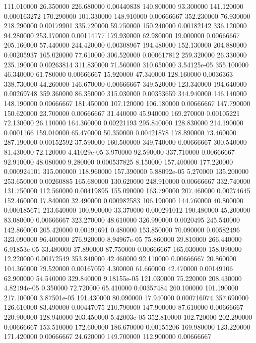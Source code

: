 111.010000	26.350000	226.680000	0.00440838
140.800000	93.300000	141.120000	0.000163272
170.290000	101.330000	148.910000	0.00666667
352.230000	76.930000	218.290000	0.00179901
335.720000	59.750000	150.240000	0.00182142
336.120000	94.280000	253.170000	0.00114177
179.930000	62.980000	19.000000	0.00666667
205.160000	57.440000	244.420000	0.00308967
194.480000	152.130000	204.880000	0.00205937
165.020000	77.610000	306.520000	0.000617812
259.320000	26.330000	235.190000	0.00263814
311.830000	71.560000	310.650000	3.54125e-05
355.100000	46.340000	61.780000	0.00666667
15.920000	47.340000	128.160000	0.0036363
338.730000	44.260000	146.670000	0.00666667
349.520000	123.340000	194.640000	0.00269748
359.360000	86.350000	315.030000	0.00353659
344.940000	146.140000	148.190000	0.00666667
181.450000	107.120000	106.180000	0.00666667
147.790000	150.620000	23.700000	0.00666667
31.440000	45.940000	169.270000	0.00105221
72.130000	26.110000	164.360000	0.00221193
295.840000	128.830000	214.190000	0.0001166
159.010000	65.470000	50.350000	0.00421878
178.890000	73.460000	287.190000	0.00152592
37.590000	160.500000	349.740000	0.00666667
300.540000	81.430000	72.120000	4.41029e-05
3.970000	92.590000	337.710000	0.00666667
92.910000	48.080000	9.280000	0.000537825
8.150000	157.400000	177.220000	0.000924101
315.000000	118.960000	157.390000	5.88092e-05
5.270000	135.200000	253.650000	0.00260885
165.680000	130.620000	248.910000	0.00666667
332.740000	131.750000	112.560000	0.00419895
155.090000	163.790000	207.460000	0.00274645
152.460000	17.840000	32.490000	0.000982583
106.190000	144.760000	40.800000	0.000185671
213.640000	100.900000	33.370000	0.000291012
190.480000	45.200000	83.080000	0.00666667
323.270000	48.610000	326.990000	0.0020495
245.540000	142.860000	205.420000	0.00191691
0.480000	153.850000	70.090000	0.00582496
323.090000	96.400000	276.920000	8.94967e-05
75.860000	39.810000	266.440000	6.91853e-05
33.480000	37.890000	87.750000	0.00666667
165.030000	158.090000	12.220000	0.00172549
353.840000	42.460000	92.110000	0.00666667
20.860000	104.360000	79.520000	0.00167059
4.300000	61.660000	42.470000	0.00149106
62.900000	54.540000	329.840000	9.18155e-05
121.030000	75.220000	208.430000	4.82194e-05
0.350000	72.720000	65.410000	0.00357484
260.100000	101.190000	217.100000	3.87501e-05
191.430000	80.090000	17.940000	0.000716074
357.690000	126.610000	83.490000	0.00447075
210.790000	147.900000	87.610000	0.00666667
220.900000	128.940000	203.450000	5.42003e-05
352.810000	102.720000	202.290000	0.00666667
153.510000	172.600000	186.670000	0.00155206
169.980000	123.220000	171.420000	0.00666667
24.620000	149.700000	112.900000	0.00666667
